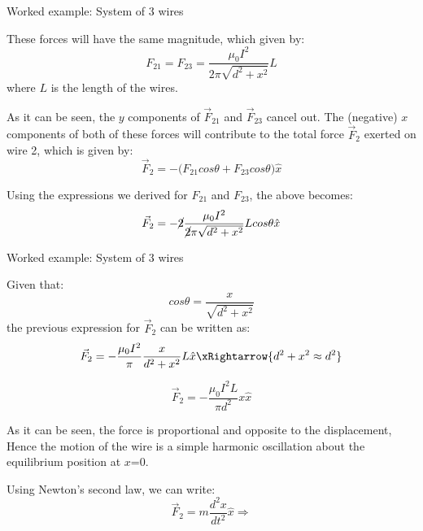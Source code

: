 {\begin{frame}{Worked example: System of 3 wires}

  These forces will have the same magnitude, which given by:
  \begin{equation*}
      F_{21} = F_{23} = \frac{\mu_0 I^2}{2\pi \sqrt{d^2+x^2}} L
  \end{equation*}
  where $L$ is the length of the wires.

  As it can be seen, the $y$ components of $\vec{F}_{21}$ and $\vec{F}_{23}$
  cancel out. The (negative) $x$ components of both of these forces
  will contribute to the total force $\vec{F}_{2}$ exerted on wire 2,
  which is given by:
  \begin{equation*}
      \vec{F}_2 = - \Big( F_{21} cos\theta + F_{23} cos\theta \Big) \hat{x}
  \end{equation*}

  Using the expressions we derived for $F_{21}$ and $F_{23}$,
  the above becomes:
  \begin{equation*}
      \vec{F}_2 = - \cancel{2} \frac{\mu_0 I^2}{\cancel{2}\pi \sqrt{d^2+x^2}} L cos\theta \hat{x}
  \end{equation*}

\end{frame}

%
%
%

\begin{frame}{Worked example: System of 3 wires}

  Given that:
  \begin{equation*}
      cos\theta = \frac{x}{\sqrt{d^2+x^2}}
  \end{equation*}
  the previous expression for $\vec{F}_2$ can be written as:
  \begin{equation*}
      \vec{F}_2 = - \frac{\mu_0 I^2}{\pi} \frac{x}{d^2+x^2} L \hat{x} \xRightarrow{d^2+x^2 \approx d^2}
  \end{equation*}

  \begin{equation*}
      \vec{F}_2 = - \frac{\mu_0 I^2 L}{\pi d^2} x \hat{x}
  \end{equation*}

  As it can be seen, the force is proportional and opposite to the
  displacement, Hence the motion of the wire is a simple harmonic oscillation
  about the equilibrium position at $x$=0.

  Using Newton's second law, we can write:
  \begin{equation*}
      \vec{F}_2 = m \frac{d^2 x}{dt^2} \hat{x} \Rightarrow
  \end{equation*}


\end{frame}}
